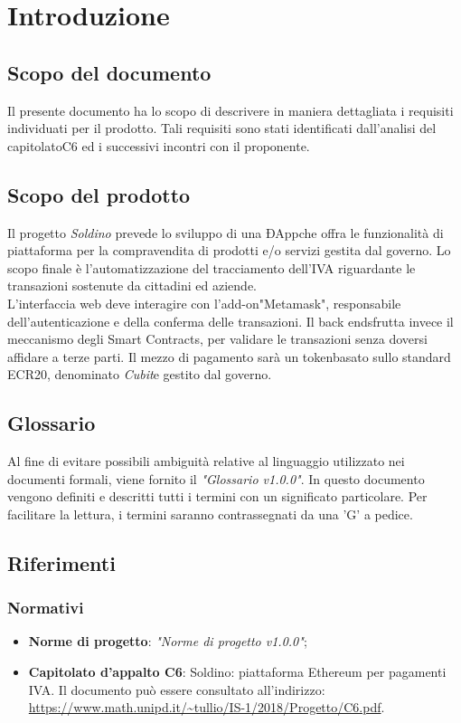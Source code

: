 \section{Introduzione} 
\subsection{Scopo del documento}
Il presente documento ha lo scopo di descrivere in maniera dettagliata i requisiti individuati per il prodotto. Tali requisiti sono stati identificati dall'analisi del capitolato\glosp C6 ed i successivi incontri con il proponente.
\subsection{Scopo del prodotto}
Il progetto \textit{Soldino} prevede lo sviluppo di una ÐApp\glosp che offra le funzionalità di piattaforma per la compravendita di prodotti e/o servizi gestita dal governo\glo. Lo scopo finale è l'automatizzazione del tracciamento dell'IVA riguardante le transazioni sostenute da cittadini ed aziende. \\ L'interfaccia web deve interagire con l'add-on\glosp "Metamask"\glo, responsabile dell'autenticazione e della conferma delle transazioni. Il back end\glosp sfrutta invece il meccanismo degli Smart Contracts\glo, per validare le transazioni senza doversi affidare a terze parti. Il mezzo di pagamento sarà un token\glosp basato sullo standard ECR20\glo, denominato \textit{Cubit}\glosp e gestito dal governo\glo.
\subsection{Glossario}
Al fine di evitare possibili ambiguità relative al linguaggio utilizzato nei documenti formali, viene fornito il \textit{"Glossario v1.0.0"}. In questo documento vengono definiti e descritti tutti i termini con un significato particolare. Per facilitare la lettura, i termini saranno contrassegnati da una 'G' a pedice.
\subsection{Riferimenti}
\subsubsection{Normativi}
\begin{itemize}
	\item \textbf{Norme di progetto}: \textit{"Norme di progetto v1.0.0"};
	\item \textbf{Capitolato d'appalto C6}: Soldino: piattaforma Ethereum per pagamenti IVA. Il documento può essere consultato all'indirizzo: \textsf{\url{ https://www.math.unipd.it/~tullio/IS-1/2018/Progetto/C6.pdf}}.
\end{itemize}

